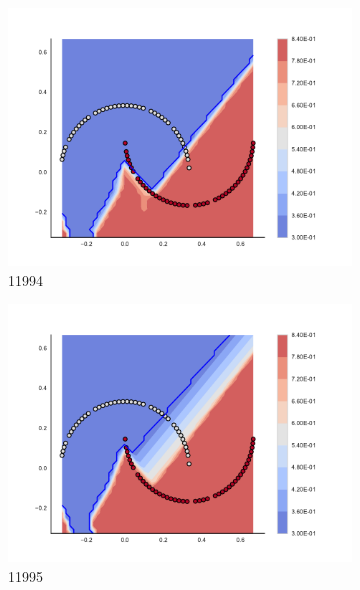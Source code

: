 \begin{figure}[h]
\begin{subfigure}[b]{0.09\textwidth}
    \includegraphics[clip, trim=2.35cm 1.75cm 4.5cm 0cm,width=\textwidth]{img/convergence/11994.pdf}
    \caption{11994}
    \label{fig:convergence_11994}
\end{subfigure}
%
\begin{subfigure}[b]{0.09\textwidth}
    \includegraphics[clip, trim=2.35cm 1.75cm 4.5cm 0cm,width=\textwidth]{img/convergence/11995.pdf}
    \caption{11995}
    \label{fig:convergence_11995}
\end{subfigure}
%
\begin{subfigure}[b]{0.09\textwidth}

\end{subfigure}
\end{figure}
